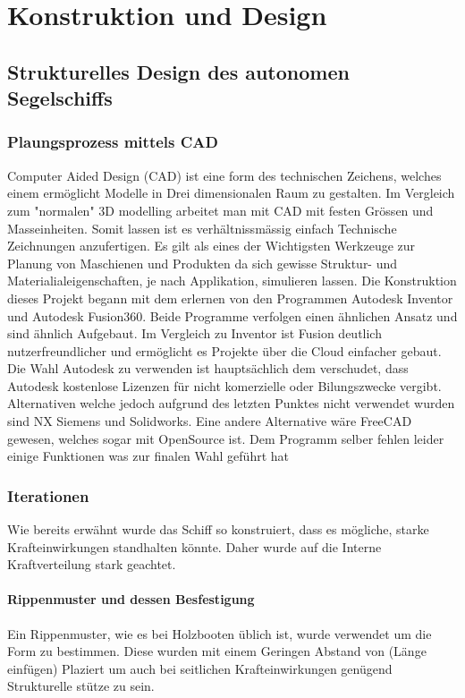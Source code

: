 

\chapter{Konstruktion und Design}
\label{chap:konstruktion}


\section{Strukturelles Design des autonomen Segelschiffs}
\subsection{Plaungsprozess mittels CAD}
Computer Aided Design (CAD) ist eine form des technischen Zeichens, welches einem ermöglicht Modelle in Drei dimensionalen Raum zu gestalten. Im Vergleich zum "normalen" 3D modelling arbeitet man mit CAD mit festen Grössen und Masseinheiten. Somit lassen ist es verhältnissmässig einfach Technische Zeichnungen anzufertigen. Es gilt als eines der Wichtigsten Werkzeuge zur Planung von Maschienen und Produkten da sich gewisse Struktur- und Materialialeigenschaften, je nach Applikation, simulieren lassen. Die Konstruktion dieses Projekt begann mit dem erlernen von den Programmen Autodesk Inventor und Autodesk Fusion360. 
Beide Programme verfolgen einen ähnlichen Ansatz und sind ähnlich Aufgebaut. Im Vergleich zu Inventor ist Fusion deutlich nutzerfreundlicher und ermöglicht es Projekte über die Cloud einfacher gebaut. Die Wahl Autodesk zu verwenden ist hauptsächlich dem verschudet, dass Autodesk kostenlose Lizenzen für nicht komerzielle oder Bilungszwecke vergibt.
Alternativen welche jedoch aufgrund des letzten Punktes nicht verwendet wurden sind NX Siemens und Solidworks. 
Eine andere Alternative wäre FreeCAD gewesen, welches sogar mit OpenSource ist. Dem Programm selber fehlen leider einige Funktionen was zur finalen Wahl geführt hat


\subsection{Iterationen}
Wie bereits erwähnt wurde das Schiff so konstruiert, dass es mögliche, starke Krafteinwirkungen standhalten könnte. Daher wurde auf die Interne Kraftverteilung stark geachtet.
\subsubsection{Rippenmuster und dessen Besfestigung}
Ein Rippenmuster, wie es bei Holzbooten üblich ist, wurde verwendet um die Form zu bestimmen. Diese wurden mit einem Geringen Abstand von (Länge einfügen) Plaziert um auch bei seitlichen Krafteinwirkungen genügend Strukturelle stütze zu sein.

